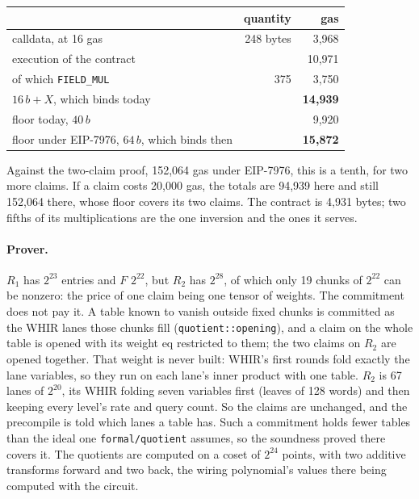 \documentclass[11pt]{article}
\newcommand{\code}[1]{\texttt{#1}}
\begin{document}
\begin{center}
\begin{tabular}{@{}lrr@{}}
\toprule
 & quantity & gas \\
\midrule
calldata, at 16 gas & 248 bytes & 3{,}968 \\
execution of the contract & & 10{,}971 \\
\quad of which \code{FIELD\_MUL} & 375 & 3{,}750 \\
\midrule
$16\, b + X$, which binds today & & \textbf{14{,}939} \\
floor today, $40\, b$ & & 9{,}920 \\
floor under EIP-7976, $64\, b$, which binds then & & \textbf{15{,}872} \\
\bottomrule
\end{tabular}
\end{center}

\noindent Against the two-claim proof, 152{,}064 gas under EIP-7976, this is a tenth, for two more claims. If a claim costs 20{,}000 gas, the totals are 94{,}939 here and still 152{,}064 there, whose floor covers its two claims. The contract is 4{,}931 bytes; two fifths of its multiplications are the one inversion and the ones it serves.

\paragraph{Prover.} $R_1$ has $2^{23}$ entries and $F$ $2^{22}$, but $R_2$ has $2^{28}$, of which only 19 chunks of $2^{22}$ can be nonzero: the price of one claim being one tensor of weights. The commitment does not pay it. A table known to vanish outside fixed chunks is committed as the WHIR lanes those chunks fill (\code{quotient::opening}), and a claim on the whole table is opened with its weight $\mathrm{eq}$ restricted to them; the two claims on $R_2$ are opened together. That weight is never built: WHIR's first rounds fold exactly the lane variables, so they run on each lane's inner product with one table. $R_2$ is 67 lanes of $2^{20}$, its WHIR folding seven variables first (leaves of 128 words) and then keeping every level's rate and query count. So the claims are unchanged, and the precompile is told which lanes a table has. Such a commitment holds fewer tables than the ideal one \code{formal/quotient} assumes, so the soundness proved there covers it. The quotients are computed on a coset of $2^{24}$ points, with two additive transforms forward and two back, the wiring polynomial's values there being computed with the circuit.



\end{document}

